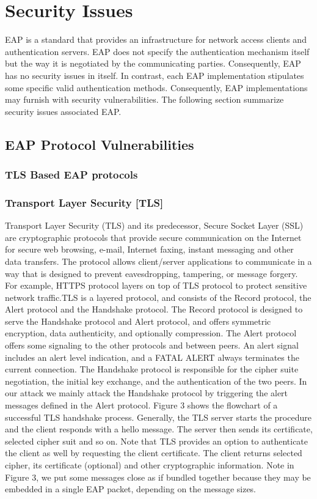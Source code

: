 \chapter{Security Issues}

EAP is a standard that provides an infrastructure for network access clients and authentication servers. EAP does not specify the authentication mechanism itself but the way it is negotiated by the communicating parties. Consequently, EAP has no security issues in itself. In contrast, each EAP implementation stipulates some specific valid authentication methods. Consequently, EAP implementations may furnish with security vulnerabilities. The following section summarize security issues associated EAP.

\section{EAP Protocol Vulnerabilities}
\subsection{TLS Based EAP protocols}
\subsection{Transport Layer Security [TLS]}
Transport Layer Security (TLS) and its predecessor, Secure Socket Layer (SSL) are cryptographic protocols that provide secure communication on the Internet for secure web browsing, e-mail, Internet faxing, instant messaging and other data transfers. The protocol allows client/server applications to communicate in a way that is designed to prevent eavesdropping, tampering, or message forgery. For example, HTTPS protocol layers on top of TLS protocol to protect sensitive network traffic.TLS is a layered protocol, and consists of the Record protocol, the Alert protocol and the Handshake protocol. The Record protocol is designed to serve the Handshake protocol and Alert protocol, and offers symmetric encryption, data authenticity, and optionally compression. The Alert protocol offers some signaling to the other protocols and between peers. An alert signal includes an alert level indication, and a FATAL ALERT always terminates the current connection. The Handshake protocol is responsible for the cipher suite
negotiation, the initial key exchange, and the authentication of the two peers. In our attack we mainly attack the Handshake protocol by triggering the alert messages defined in the Alert protocol. Figure 3 shows the flowchart of a successful TLS handshake process. Generally, the TLS server starts the procedure and the client responds with a hello message. The server then sends its certificate, selected cipher suit and so on. Note that TLS provides an option to authenticate the client as well by requesting the client certificate. The client returns selected
cipher, its certificate (optional) and other cryptographic information. Note in Figure 3, we put some messages close
as if bundled together because they may be embedded in a single EAP packet, depending on the message sizes. 

